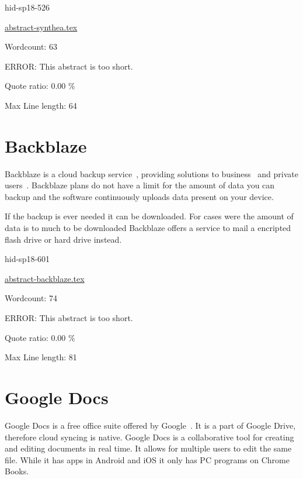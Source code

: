\begin{IU}

hid-sp18-526

\href{https://github.com/cloudmesh-community/hid-sp18-526/blob/master//technology/abstract-synthea.tex}{abstract-synthea.tex}

 

Wordcount: 63

ERROR: This abstract is too short.


Quote ratio: 0.00 \%
 
Max Line length: 64
\end{IU}

\section{Backblaze}

Backblaze is a cloud backup service~\cite{hid-sp18-601-www-bblaze-about}, 
providing solutions to business~\cite{hid-sp18-601-www-bblaze-business} and 
private users~\cite{hid-sp18-601-www-bblaze-personal}. Backblaze plans do not
have a limit for the amount of data you can backup and the software continuously 
uploads data present on your device. 

If the backup is ever needed it can be downloaded. For cases were the amount of 
data is to much to be downloaded Backblaze offers a service to mail a encripted 
flash drive or hard drive instead.

\begin{IU}

hid-sp18-601

\href{https://github.com/cloudmesh-community/hid-sp18-601/blob/master//technology/abstract-backblaze.tex}{abstract-backblaze.tex}

 

Wordcount: 74

ERROR: This abstract is too short.


Quote ratio: 0.00 \%
 
Max Line length: 81
\end{IU}

\section{Google Docs}

Google Docs is a free office suite offered by 
Google~\cite{hid-sp18-601-www-gdoc-about}. It is a part of Google 
Drive, therefore cloud syncing is native. Google Docs is a collaborative tool
for creating and editing documents in real time. It allows for multiple users
to edit the same file. While it has apps in Android and iOS it only has PC
programs on Chrome Books.

